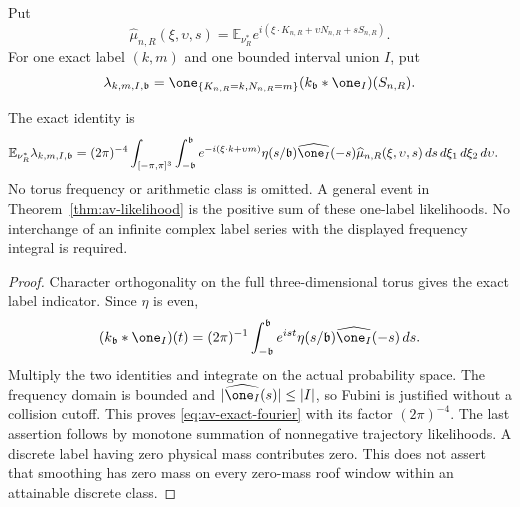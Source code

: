 Put
\[
 \widehat\mu_{n,R}(\xi,\upsilon,s)=
 \mathbb E_{\nu_R^*}
 e^{i(\xi\cdot K_{n,R}+\upsilon N_{n,R}+sS_{n,R})}.
\]
For one exact label $(k,m)$ and one bounded interval union $I$, put
\[
 \lambda_{k,m,I,\mathfrak b}
 =\one_{\{K_{n,R}=k,N_{n,R}=m\}}
       (k_{\mathfrak b}*\one_I)(S_{n,R}).
\]
\begin{corollary}
\label{cor:av-exact-fourier}
The exact identity is
\begin{align}
 \mathbb E_{\nu_R^*}\lambda_{k,m,I,\mathfrak b}
  ={}&(2\pi)^{-4}\int_{[-\pi,\pi]^3}\int_{-\mathfrak b}^{\mathfrak b}
      e^{-i(\xi\cdot k+\upsilon m)}
      \eta(s/\mathfrak b)\widehat{\one_I}(-s)
      \widehat\mu_{n,R}(\xi,\upsilon,s)
                           \,ds\,d\xi_1\,d\xi_2\,d\upsilon.
                                                       \label{eq:av-exact-fourier}
\end{align}
No torus frequency or arithmetic class is omitted.  A general event
in Theorem~\ref{thm:av-likelihood} is the positive sum of these
one-label likelihoods.  No interchange of an infinite complex label
series with the displayed frequency integral is required.
\end{corollary}
\begin{proof}
Character orthogonality on the full three-dimensional torus gives
the exact label indicator.  Since $\eta$ is even,
\[
 (k_{\mathfrak b}*\one_I)(t)
 =(2\pi)^{-1}\int_{-\mathfrak b}^{\mathfrak b}
       e^{ist}\eta(s/\mathfrak b)\widehat{\one_I}(-s)\,ds.
\]
Multiply the two identities and integrate on the actual probability
space.  The frequency domain is bounded and
$|\widehat{\one_I}(s)|\le|I|$, so Fubini is justified without a
collision cutoff.  This proves \eqref{eq:av-exact-fourier} with its
factor $(2\pi)^{-4}$.  The last assertion follows by monotone
summation of nonnegative trajectory likelihoods.  A discrete label
having zero physical mass contributes zero.  This does not assert
that smoothing has zero mass on every zero-mass roof window within
an attainable discrete class.
\end{proof}

